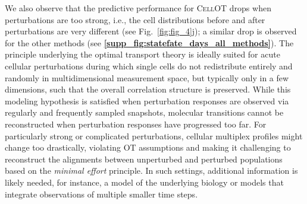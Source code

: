 \smallskip

We also observe that the predictive performance for \textsc{CellOT} drops when perturbations are too strong, i.e., the cell distributions before and after perturbations are very different (see Fig.~\ref{fig:fig_4}j); a similar drop is observed for the other methods (see \textbf{\ref{supp_fig:statefate_days_all_methods}}).
The principle underlying the optimal transport theory is ideally suited for acute cellular perturbations during which single cells do not redistribute entirely and randomly in multidimensional measurement space, but typically only in a few dimensions, such that the overall correlation structure is preserved. While this modeling hypothesis is satisfied when perturbation responses are observed via regularly and frequently sampled snapshots, molecular transitions cannot be reconstructed when perturbation responses have progressed too far. For particularly strong or complicated perturbations, cellular multiplex profiles might change too drastically, violating OT assumptions and making it challenging to reconstruct the alignments between unperturbed and perturbed populations based on the \emph{minimal effort} principle.
In such settings, additional information is likely needed, for instance, a model of the underlying biology or models that integrate observations of multiple smaller time steps. 

